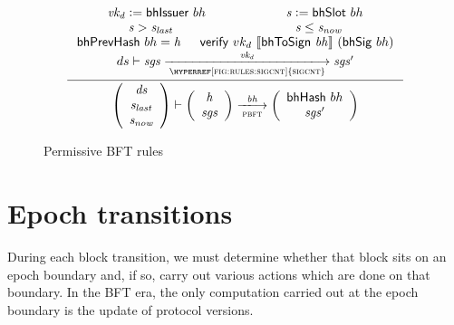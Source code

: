 \documentclass[11pt,a4paper]{article}
\newcommand{\var}[1]{\mathit{#1}}
\newcommand{\fun}[1]{\mathsf{#1}}
\newcommand{\type}[1]{\mathsf{#1}}
\newcommand{\trans}[2]{\xlongrightarrow[\textsc{#1}]{#2}}
\newcommand{\serialised}[1]{\llbracket \var{#1} \rrbracket}
\newcommand{\leteq}{\ensuremath{\mathrel{\mathop:}=}}
\newcommand{\verifyname}{verify}
\newcommand{\bhsigname}{bhSig}
\newcommand{\bhissuername}{bhIssuer}
\newcommand{\verify}[3]{\fun{\verifyname} ~ #1 ~ #2 ~ #3}
\newcommand{\bhsig}[1]{\fun{\bhsigname} ~ #1}
\newcommand{\bhissuer}[1]{\fun{\bhissuername} ~ #1}
\begin{document}
\begin{figure}[ht]
  \begin{equation*}
    \inference
    {
      \var{vk_d} \leteq \bhissuer{bh} & \var{s} \leteq \bhslot{bh}
      \\ \var{s} > \var{s_{last}} & \var{s} \leq \var{s_{now}}
      \\ \bhprevhash{bh} = \var{h} & \verify{vk_d}{\serialised{\bhtosign{bh}}}{(\bhsig{bh})}
      \\
      ds
      \vdash
      \var{sgs} \trans{\hyperref[fig:rules:sigcnt]{sigcnt}}{\var{vk_d}} \var{sgs'}
      \\
    }
    {
      \left(
        {\begin{array}{c}
           \var{ds} \\
           \var{s_{last}} \\
           \var{s_{now}} \\
         \end{array}}
     \right)
     \vdash
     \left(
       {\begin{array}{c}
          \var{h} \\
          \var{sgs}
        \end{array}}
    \right)
    \trans{pbft}{\var{bh}}
    \left(
      {\begin{array}{c}
         \bhhash{bh} \\
         \var{sgs}'
       \end{array}}
   \right)
 }
\end{equation*}
\caption{Permissive BFT rules}
\label{fig:rules:pbft}
\end{figure}


\clearpage

\section{Epoch transitions}

\newcommand{\Epoch}{\type{Epoch}}

\newcommand{\ETState}{\type{ETState}}
\newcommand{\ETEnv}{\type{ETEnv}}

\newcommand{\sepochname}{sEpoch}
\newcommand{\sepoch}[1]{\fun{\sepochname}\ #1}

During each block transition, we must determine whether that block sits on an
epoch boundary and, if so, carry out various actions which are done on that
boundary. In the BFT era, the only computation carried out at the epoch boundary
is the update of protocol versions.
\end{document}
